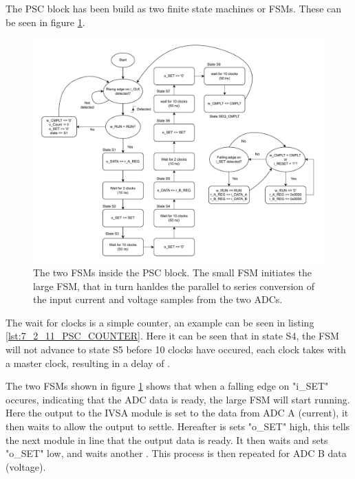 The PSC block has been build as two finite state machines or FSMs. These can be seen in figure \ref{fig_7_2_11_PSC_FSM}.
\begin{figure}[H]
    \centering
    \includegraphics[clip, trim=0 0 0 0, width=1\textwidth]{Sections/7_SystemDesign/Figures/PSC_FSM.pdf}
    \caption{The two FSMs inside the PSC block. The small FSM initiates the large FSM, that in turn hanldes the parallel to series conversion of the input current and voltage samples from the two ADCs.}
    \label{fig_7_2_11_PSC_FSM}
\end{figure}
The wait for clocks is a simple counter, an example can be seen in listing \ref{lst:7_2_11_PSC_COUNTER}. Here it can be seen that in state S4, the FSM will not advance to state S5 before 10 clocks have occured, each clock takes  with a  master clock, resulting in a delay of .



The two FSMs shown in figure \ref{fig_7_2_11_PSC_FSM} shows that when a falling edge on "i\_SET" occures, indicating that the ADC data is ready, the large FSM will start running. Here the output to the IVSA module is set to the data from ADC A (current), it then waits  to allow the output to settle. Hereafter is sets "o\_SET" high, this tells the next module in line that the output data is ready. It then waits  and sets "o\_SET" low, and waits another . This process is then repeated for ADC B data (voltage).

